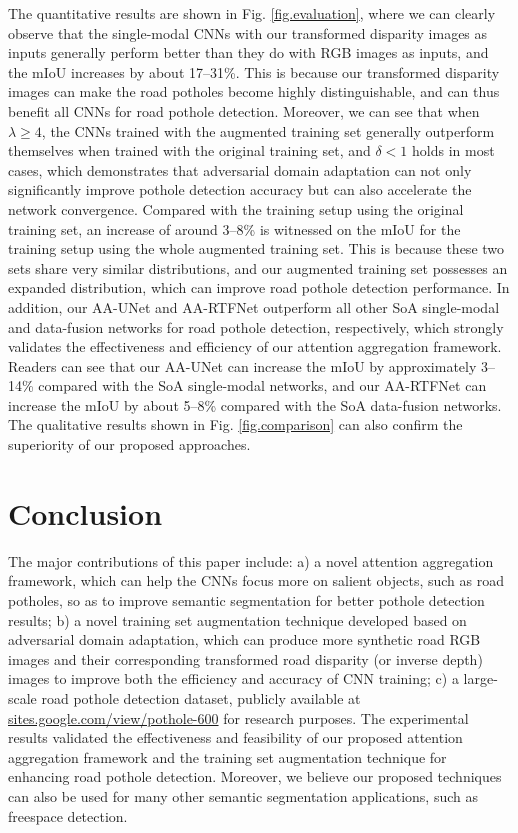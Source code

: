 \documentclass[runningheads]{llncs}
\begin{document}
The quantitative results are shown in Fig. \ref{fig.evaluation}, where we can clearly observe that the single-modal CNNs with our transformed disparity images as inputs generally perform better than they do with RGB images as inputs, and the mIoU increases by about 17--31\%. This is because our transformed disparity images can make the road potholes become highly distinguishable, and can thus benefit all CNNs for road pothole detection. Moreover, we can see that when $\lambda \geq 4$, the CNNs trained with the augmented training set generally outperform themselves when trained with the original training set, and $\delta < 1$ holds in most cases, which demonstrates that adversarial domain adaptation can not only significantly improve pothole detection accuracy but  can also accelerate the network convergence. Compared with the training setup using the original training set, an increase of around 3--8\% is witnessed on the mIoU for the training setup using the whole augmented training set. This is because these two sets share very similar distributions, and our augmented training set possesses an expanded distribution, which can improve road pothole detection performance. In addition, our AA-UNet and AA-RTFNet outperform all other SoA single-modal and data-fusion networks for road pothole detection, respectively, which strongly validates the effectiveness and efficiency of our attention aggregation framework. Readers can see that our AA-UNet can increase the mIoU by approximately 3--14\% compared with the SoA single-modal networks, and our AA-RTFNet can increase the mIoU by about 5--8\% compared with the SoA data-fusion networks. The qualitative results shown in Fig. \ref{fig.comparison} can also confirm the superiority of our proposed approaches.


\section{Conclusion}
\label{sec.conclusion}
The major contributions of this paper include: a) a novel attention aggregation framework, which can help the CNNs focus more on salient objects, such as road potholes, so as to improve semantic segmentation for better  pothole detection results; b) a novel training set augmentation technique developed based on adversarial domain adaptation, which can produce more synthetic road RGB images and their corresponding transformed road disparity (or inverse depth) images to improve both the efficiency and accuracy of CNN training; c) a large-scale road pothole detection dataset, publicly available at \url{sites.google.com/view/pothole-600} for research purposes. The experimental results validated the effectiveness and feasibility of our proposed attention aggregation framework and the training set augmentation technique for enhancing road pothole detection. Moreover, we believe our proposed techniques can also be used for many other semantic segmentation applications, such as freespace detection.
\end{document}
